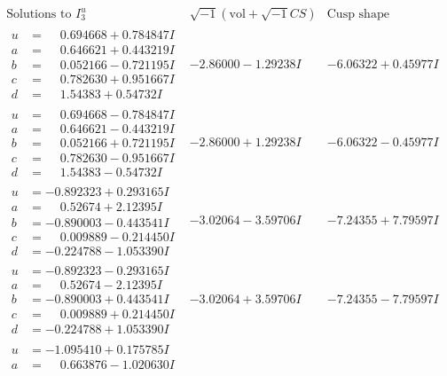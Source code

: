 \documentclass[1p]{elsarticle_modified}
\theoremstyle{definition}
\newcommand{\I}{\sqrt{-1}}
\begin{document}
$$\begin{array}{c|c|c}  
\text{Solutions to }I^u_{3}& \I (\text{vol} + \sqrt{-1}CS) & \text{Cusp shape}\\
 \hline 
\begin{aligned}
u &= \phantom{-}0.694668 + 0.784847 I \\
a &= \phantom{-}0.646621 + 0.443219 I \\
b &= \phantom{-}0.052166 - 0.721195 I \\
c &= \phantom{-}0.782630 + 0.951667 I \\
d &= \phantom{-}1.54383 + 0.54732 I\end{aligned}
 & -2.86000 - 1.29238 I & -6.06322 + 0.45977 I \\ \hline\begin{aligned}
u &= \phantom{-}0.694668 - 0.784847 I \\
a &= \phantom{-}0.646621 - 0.443219 I \\
b &= \phantom{-}0.052166 + 0.721195 I \\
c &= \phantom{-}0.782630 - 0.951667 I \\
d &= \phantom{-}1.54383 - 0.54732 I\end{aligned}
 & -2.86000 + 1.29238 I & -6.06322 - 0.45977 I \\ \hline\begin{aligned}
u &= -0.892323 + 0.293165 I \\
a &= \phantom{-}0.52674 + 2.12395 I \\
b &= -0.890003 - 0.443541 I \\
c &= \phantom{-}0.009889 - 0.214450 I \\
d &= -0.224788 - 1.053390 I\end{aligned}
 & -3.02064 - 3.59706 I & -7.24355 + 7.79597 I \\ \hline\begin{aligned}
u &= -0.892323 - 0.293165 I \\
a &= \phantom{-}0.52674 - 2.12395 I \\
b &= -0.890003 + 0.443541 I \\
c &= \phantom{-}0.009889 + 0.214450 I \\
d &= -0.224788 + 1.053390 I\end{aligned}
 & -3.02064 + 3.59706 I & -7.24355 - 7.79597 I \\ \hline\begin{aligned}
u &= -1.095410 + 0.175785 I \\
a &= \phantom{-}0.663876 - 1.020630 I \\

\end{aligned}
\end{array}$$
\end{document}
